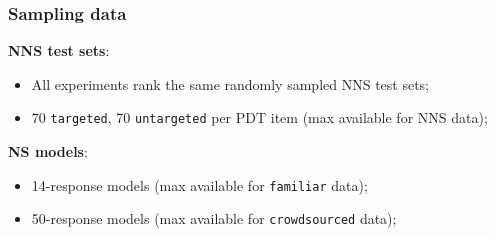 \documentclass[handout,xcolor={dvipsnames}]{beamer}
\newcommand{\param}[1]{\texttt{#1}}
\begin{document}
\begin{frame}
\frametitle{Sampling data}
\normalsize

\pause
\textbf{NNS test sets}:
\begin{itemize}
\item All experiments rank the same randomly sampled NNS test sets;
\item 70 \param{targeted}, 70 \param{untargeted} per PDT item (max available for NNS data);
\end{itemize}

\vspace{1.5em}

\pause
\textbf{NS models}:
\begin{itemize}
\item 14-response models (max available for \param{familiar} data);
\item 50-response models (max available for \param{crowdsourced} data);
\end{itemize}
\end{frame}
\end{document}
